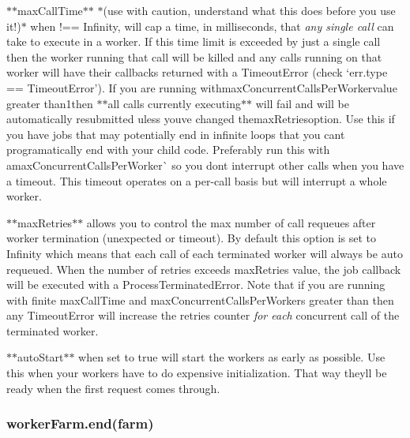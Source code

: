 \begin{DoxyItemize}
\item $\ast$$\ast${\ttfamily max\+Call\+Time}$\ast$$\ast$ $\ast$(use with caution, understand what this does before you use it!)$\ast$ when {\ttfamily !== Infinity}, will cap a time, in milliseconds, that {\itshape any single call} can take to execute in a worker. If this time limit is exceeded by just a single call then the worker running that call will be killed and any calls running on that worker will have their callbacks returned with a {\ttfamily Timeout\+Error} (check `err.\+type == \textquotesingle{}Timeout\+Error'{\ttfamily ). If you are running with}max\+Concurrent\+Calls\+Per\+Worker{\ttfamily value greater than}1{\ttfamily then $\ast$$\ast$all calls currently executing$\ast$$\ast$ will fail and will be automatically resubmitted uless you\textquotesingle{}ve changed the}max\+Retries{\ttfamily option. Use this if you have jobs that may potentially end in infinite loops that you can\textquotesingle{}t programatically end with your child code. Preferably run this with a}max\+Concurrent\+Calls\+Per\+Worker\`{} so you don\textquotesingle{}t interrupt other calls when you have a timeout. This timeout operates on a per-\/call basis but will interrupt a whole worker.
\item $\ast$$\ast${\ttfamily max\+Retries}$\ast$$\ast$ allows you to control the max number of call requeues after worker termination (unexpected or timeout). By default this option is set to {\ttfamily Infinity} which means that each call of each terminated worker will always be auto requeued. When the number of retries exceeds {\ttfamily max\+Retries} value, the job callback will be executed with a {\ttfamily Process\+Terminated\+Error}. Note that if you are running with finite {\ttfamily max\+Call\+Time} and {\ttfamily max\+Concurrent\+Calls\+Per\+Workers} greater than {} then any {\ttfamily Timeout\+Error} will increase the retries counter {\itshape for each} concurrent call of the terminated worker.
\item $\ast$$\ast${\ttfamily auto\+Start}$\ast$$\ast$ when set to {\ttfamily true} will start the workers as early as possible. Use this when your workers have to do expensive initialization. That way they\textquotesingle{}ll be ready when the first request comes through.
\end{DoxyItemize}

\subsubsection*{worker\+Farm.\+end(farm)}

